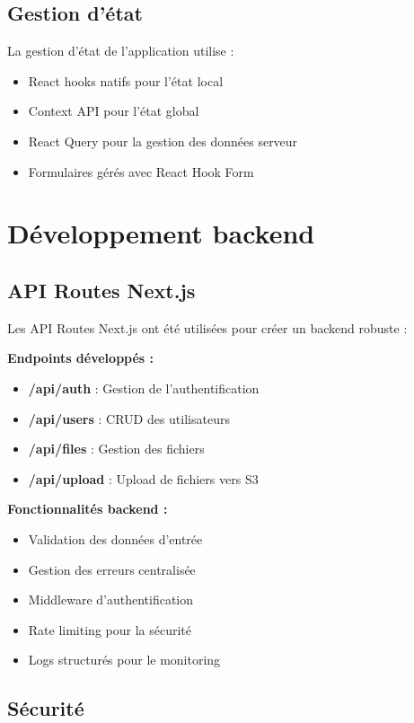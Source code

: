 \subsection{Gestion d'état}

La gestion d'état de l'application utilise :
\begin{itemize}
    \item React hooks natifs pour l'état local
    \item Context API pour l'état global
    \item React Query pour la gestion des données serveur
    \item Formulaires gérés avec React Hook Form
\end{itemize}

\section{Développement backend}

\subsection{API Routes Next.js}

Les API Routes Next.js ont été utilisées pour créer un backend robuste :

\textbf{Endpoints développés :}
\begin{itemize}
    \item \textbf{/api/auth} : Gestion de l'authentification
    \item \textbf{/api/users} : CRUD des utilisateurs
    \item \textbf{/api/files} : Gestion des fichiers
    \item \textbf{/api/upload} : Upload de fichiers vers S3
\end{itemize}

\textbf{Fonctionnalités backend :}
\begin{itemize}
    \item Validation des données d'entrée
    \item Gestion des erreurs centralisée
    \item Middleware d'authentification
    \item Rate limiting pour la sécurité
    \item Logs structurés pour le monitoring
\end{itemize}

\subsection{Sécurité}


